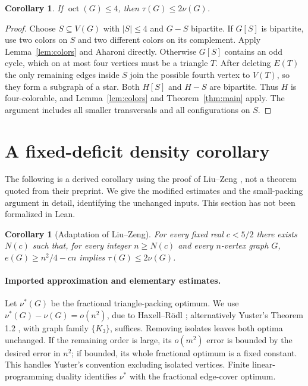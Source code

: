 \documentclass[11pt]{article}
\newtheorem{corollary}[theorem]{Corollary}
\newcommand{\oct}{\operatorname{oct}}
\begin{document}
\begin{corollary}\label{cor:oct}
If $\oct(G)\le4$, then $\tau(G)\le2\nu(G)$.
\end{corollary}
\begin{proof}
Choose $S\subseteq V(G)$ with $|S|\le4$ and $G-S$ bipartite. If
$G[S]$ is bipartite, use two colors on $S$ and two different colors on
its complement. Apply Lemma~\ref{lem:colors} and Aharoni directly.
Otherwise $G[S]$ contains an odd cycle, which on at most four vertices
must be a triangle $T$. After deleting $E(T)$ the only remaining edges
inside $S$ join the possible fourth vertex to $V(T)$, so they form a
subgraph of a star. Both $H[S]$ and $H-S$ are bipartite. Thus $H$ is
four-colorable, and Lemma~\ref{lem:colors} and Theorem~\ref{thm:main} apply.
The argument includes all smaller transversals and all configurations on $S$.
\end{proof}

\section{A fixed-deficit density corollary}
The following is a derived corollary using the proof of Liu--Zeng
\cite{LZ}, not a theorem quoted from their preprint. We give the modified
estimates and the small-packing argument in detail, identifying the
unchanged inputs. This section has not been formalized in Lean.

\begin{corollary}[Adaptation of Liu--Zeng]\label{cor:density}
For every fixed real $c<5/2$ there exists $N(c)$ such that, for every
integer $n\ge N(c)$ and every $n$-vertex graph $G$,
$e(G)\ge n^2/4-cn$ implies $\tau(G)\le2\nu(G)$.
\end{corollary}

\paragraph{Imported approximation and elementary estimates.}
Let $\nu^*(G)$ be the fractional triangle-packing optimum. We use
$\nu^*(G)-\nu(G)=o(n^2)$, due to Haxell--R\"odl \cite{HR}; alternatively
Yuster's Theorem 1.2 \cite{Yuster}, with graph family $\{K_3\}$, suffices.
Removing isolates leaves both optima unchanged. If the remaining order
is large, its $o(m^2)$ error is bounded by the desired error in $n^2$;
if bounded, its whole fractional optimum is a fixed constant. This
handles Yuster's convention excluding isolated vertices.
Finite linear-programming duality identifies $\nu^*$ with the fractional
edge-cover optimum.
\end{document}
